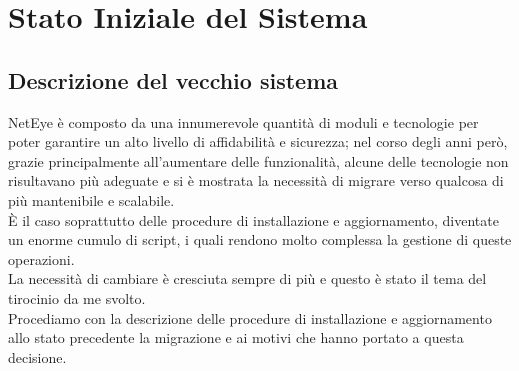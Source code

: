 \chapter{Stato Iniziale del Sistema}
\label{cha:stato_iniziale}

\section{Descrizione del vecchio sistema}
\label{sec:vecchio_sistema} NetEye è composto da una innumerevole quantità di
moduli e tecnologie per poter garantire un alto livello di affidabilità e
sicurezza; nel corso degli anni però, grazie principalmente all'aumentare delle
funzionalità, alcune delle tecnologie non risultavano più adeguate e si è mostrata
la necessità di migrare verso qualcosa di più mantenibile e scalabile.\\ È il caso
soprattutto delle procedure di installazione e aggiornamento, diventate un
enorme cumulo di script, i quali rendono molto complessa la gestione di queste operazioni.\\
La necessità di cambiare è cresciuta sempre di più e questo è stato il tema del tirocinio
da me svolto.\\ Procediamo con la descrizione delle procedure di installazione e
aggiornamento allo stato precedente la migrazione e ai motivi che hanno portato a
questa decisione.

